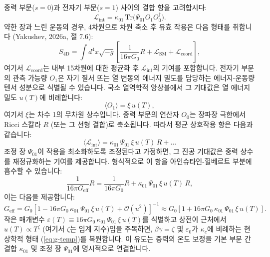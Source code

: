 \documentclass[11pt,a4paper]{article}
\newcommand{\eps}{\varepsilon}
\newcommand{\kappac}{\kappa_c}
\newcommand{\lagr}{\mathcal{L}}
\begin{document}
	중력 부문($s=0$)과 전자기 부문($s=1$) 사이의 결합 항을 고려합시다:
	\begin{equation}
		\lagr_{\text{int}} = \kappa_{01} \, \mathrm{Tr}\big(\Psi_{01} O_1 O_0^\dagger\big).
	\end{equation}
	약한 장과 느린 운동의 경우, 4차원으로 차원 축소 후 유효 작용은 다음 형태를 취합니다 (Yakushev, 2026a, 절 7.6):
	\begin{equation}
		S_{\text{4D}} = \int d^4x \sqrt{-g} \left[ \frac{1}{16\pi G_0} R + \mathcal{L}_{\text{SM}} + \mathcal{L}_{\text{coord}} \right],
	\end{equation}
	여기서 $\mathcal{L}_{\text{coord}}$는 내부 15차원에 대한 평균화 후 $\lagr_{\text{int}}$의 기여를 포함합니다. 전자기 부문의 관측 가능량 $O_1$은 자기 질서 또는 열 변동의 에너지 밀도를 담당하는 에너지-운동량 텐서 성분으로 식별될 수 있습니다. 국소 열역학적 앙상블에서 그 기대값은 열 에너지 밀도 $u(T)$에 비례합니다:
	\begin{equation}
		\langle O_1 \rangle = \xi \, u(T),
	\end{equation}
	여기서 $\xi$는 차수 1의 무차원 상수입니다. 중력 부문의 연산자 $O_0$는 장파장 극한에서 Ricci 스칼라 $R$ (또는 그 선형 결합)로 축소됩니다. 따라서 평균 상호작용 항은 다음과 같습니다:
	\begin{equation}
		\langle \lagr_{\text{int}} \rangle = \kappa_{01} \, \Psi_{01} \, \xi \, u(T) \, R + \dots
	\end{equation}
	조정 장 $\Psi_{01}$이 작용을 최소화하도록 조정된다고 가정하면, 그 진공 기대값은 중력 상수를 재정규화하는 기여를 제공합니다. 형식적으로 이 항을 아인슈타인-힐베르트 부분에 흡수할 수 있습니다:
	\begin{equation}
		\frac{1}{16\pi G_{\text{eff}}} R = \frac{1}{16\pi G_0} R + \kappa_{01} \, \Psi_{01} \, \xi \, u(T) \, R,
	\end{equation}
	이는 다음을 제공합니다:
	\begin{equation}
		G_{\text{eff}} = G_0 \left[ 1 - 16\pi G_0 \, \kappa_{01} \, \Psi_{01} \, \xi \, u(T) + \mathcal{O}(u^2) \right]^{-1} \approx G_0 \left[ 1 + 16\pi G_0 \, \kappa_{01} \, \Psi_{01} \, \xi \, u(T) \right].
	\end{equation}
	작은 매개변수 $\eps(T) \equiv 16\pi G_0 \, \kappa_{01} \, \Psi_{01} \, \xi \, u(T)$를 식별하고 상전이 근처에서 $u(T) \propto T^{\zeta}$ (여기서 $\zeta$는 임계 지수)임을 주목하면, $\beta\gamma = \zeta$ 및 $\eps_0$가 $\kappac$에 비례하는 현상학적 형태 (\ref{eq:g-temp})를 복원합니다. 이 유도는 중력의 온도 보정을 기본 부문 간 결합 $\kappa_{01}$ 및 조정 장 $\Psi_{01}$에 명시적으로 연결합니다.
	
\end{document}
